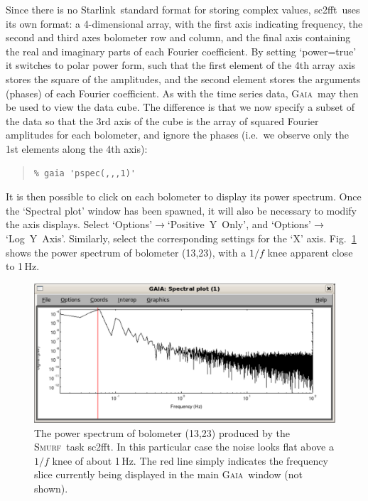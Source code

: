 \documentclass[twoside,11pt]{article}
\newcommand{\htmladdnormallink}[2]{#1}
\newcommand{\xref}[3]{#1}
\renewcommand{\_}{\texttt{\symbol{95}}}
\newenvironment{myquote}{\begin{quote}\begin{small}}{\end{small}\end{quote}}
\newcommand{\starlink}{\htmladdnormallink{Starlink}{http://starlink.jach.hawaii.edu}}
\newcommand{\gaia}{\xref{\textsc{Gaia}}{sun214}{}}
\newcommand{\smurf}{\xref{\textsc{Smurf}}{sun258}{}}
\newcommand{\task}[1]{\textsf{#1}}
\newcommand{\fft}{\xref{\task{sc2fft}}{sun258}{SC2FFT}}
\begin{document}
 Since there is no \starlink\ standard format for storing complex
 values, \fft\ uses its own format: a 4-dimensional array, with the
 first axis indicating frequency, the second and third axes bolometer
 row and column, and the final axis containing the real and imaginary
 parts of each Fourier coefficient. By setting `power=true' it
 switches to polar power form, such that the first element of the 4th
 array axis stores the square of the amplitudes, and the second
 element stores the arguments (phases) of each Fourier coefficient. As
 with the time series data, \gaia\ may then be used to view the data
 cube. The difference is that we now specify a subset of the data so
 that the 3rd axis of the cube is the array of squared Fourier
 amplitudes for each bolometer, and ignore the phases (i.e.~we observe
 only the 1st elements along the 4th axis):

\begin{myquote}
\begin{verbatim}
% gaia 'pspec(,,,1)'
\end{verbatim}
\end{myquote}

It is then possible to click on each bolometer to display its power
spectrum. Once the `Spectral plot' window has been spawned, it will
also be necessary to modify the axis displays. Select
`Options'$\rightarrow$`Positive~Y~Only', and
`Options'$\rightarrow$`Log~Y~Axis'. Similarly, select the
corresponding settings for the `X' axis. Fig.~\ref{fig:pspec} shows
the power spectrum of bolometer (13,23), with a $1/f$ knee apparent
close to 1\,Hz.

\begin{figure}
\begin{center}
\includegraphics[width=\linewidth]{sc19_pspec}
\caption{The power spectrum of bolometer (13,23) produced by the
  \smurf\ task \fft. In this particular case the noise looks flat
  above a $1/f$ knee of about 1\,Hz. The red line simply indicates the
  frequency slice currently being displayed in the main \gaia\ window
  (not shown).}
\label{fig:pspec}
\end{center}
\end{figure}
\end{document}
